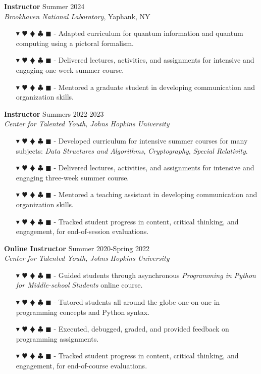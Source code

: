 \documentclass[overlapped, 10pt]{res} %
\newcommand{\physics}{$\blacktriangledown$}
\newcommand{\biochem}{$\varheartsuit$}
\newcommand{\shannon}{$\vardiamondsuit$}
\newcommand{\classic}{$\clubsuit$}
\newcommand{\quantum}{$\blacksquare$}
\newcommand{\physicscolor}{\color{YellowOrange}}
\newcommand{\biochemcolor}{\color{Emerald}}
\newcommand{\shannoncolor}{\color{Goldenrod}}
\newcommand{\classiccolor}{\color{Cyan}}
\newcommand{\quantumcolor}{\color{RedOrange}}
\newcommand{\tag}[1]{
    {\IfSubStr{#1}{\physics}{\physicscolor}{\color{White}}\physics}
    {\IfSubStr{#1}{\biochem}{\biochemcolor}{\color{White}}\biochem}
    {\IfSubStr{#1}{\shannon}{\shannoncolor}{\color{White}}\shannon}
    {\IfSubStr{#1}{\classic}{\classiccolor}{\color{White}}\classic}
    {\IfSubStr{#1}{\quantum}{\quantumcolor}{\color{White}}\quantum}
}
\begin{document}
\begin{resume}
\textbf{Instructor} \hfill Summer 2024 \\
\textit{Brookhaven National Laboratory}, Yaphank, NY
\begin{itemize} \itemsep -2pt %
\item[\tag{\physics\shannon\quantum}-] Adapted curriculum for quantum information and quantum computing using a pictoral formalism.
\item[\tag{\physics\shannon\quantum}-] Delivered lectures, activities, and assignments for intensive and engaging one-week summer course.
\item[\tag{}-] Mentored a graduate student in developing communication and organization skills.
\end{itemize}

\textbf{Instructor} \hfill Summers 2022-2023 \\
\textit{Center for Talented Youth, Johns Hopkins University}
\begin{itemize} \itemsep -2pt %
\item[\tag{\physics\shannon\classic}-] Developed curriculum for intensive summer courses for many subjects: \textit{Data Structures and Algorithms}, \textit{Cryptography}, \textit{Special Relativity}.
\item[\tag{\classic}-] Delivered lectures, activities, and assignments for intensive and engaging three-week summer course.
\item[\tag{}-] Mentored a teaching assistant in developing communication and organization skills.
\item[\tag{}-] Tracked student progress in content, critical thinking, and engagement, for end-of-session evaluations.
\end{itemize}

\textbf{Online Instructor} \hfill Summer 2020-Spring 2022 \\
\textit{Center for Talented Youth, Johns Hopkins University}
\begin{itemize} \itemsep -2pt %
\item[\tag{\classic}-] Guided students through asynchronous \textit{Programming in Python for Middle-school Students} online course.
\item[\tag{\classic}-] Tutored students all around the globe one-on-one in programming concepts and Python syntax.
\item[\tag{\classic}-] Executed, debugged, graded, and provided feedback on programming assignments.
\item[\tag{}-] Tracked student progress in content, critical thinking, and engagement, for end-of-course evaluations.
\end{itemize}


\end{resume}
\end{document}
